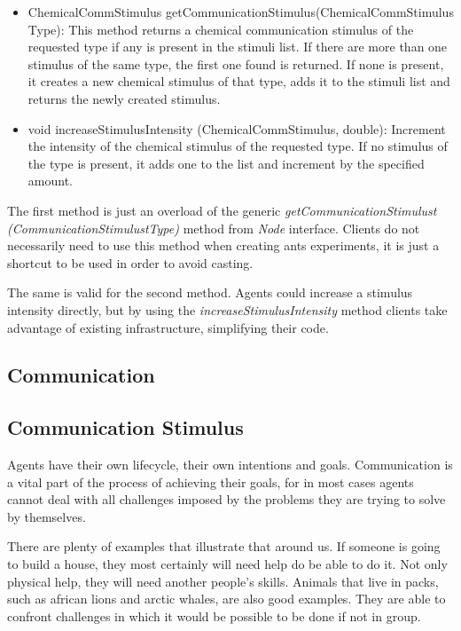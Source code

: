 \begin{itemize}
  \item ChemicalCommStimulus getCommunicationStimulus(ChemicalCommStimulus Type): This method returns a chemical communication stimulus of the requested type if any is present in the stimuli list. If there are more than one stimulus of the same type, the first one found is returned. If none is present, it creates a new chemical stimulus of that type, adds it to the stimuli list and returns the newly  created stimulus.

  \item void increaseStimulusIntensity (ChemicalCommStimulus, double): Increment the intensity of the chemical stimulus of the requested type. If no stimulus of the type is present, it adds one to the list and increment by the specified amount.
\end{itemize}

The first method is just an overload of the generic \emph{getCommunicationStimulust (CommunicationStimulustType)} method from \emph{Node} interface. Clients do not necessarily need to use this method when creating ants experiments, it is just a shortcut to be used in order to avoid casting.

The same is valid for the second method. Agents could increase a stimulus intensity directly, but by  using the \emph{increaseStimulusIntensity} method clients take advantage of existing infrastructure, simplifying their code.

\subsection {Communication}
\label{subsec:comm-stimulus}

\subsection{Communication Stimulus}

Agents have their own lifecycle, their own intentions and goals. Communication is a vital part of the process of achieving their goals, for in most cases agents cannot deal with all challenges imposed by the problems they are trying to solve by themselves.

There are plenty of examples that illustrate that around us. If someone is going to build a house, they most certainly will need help do be able to do it. Not only physical help, they will need another people's skills. Animals that live in packs, such as african lions and arctic whales, are also good examples. They are able to confront challenges in which it would be possible to be done if not in group.

